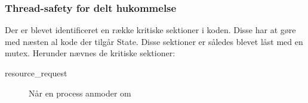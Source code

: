 \subsubsection*{Thread-safety for delt hukommelse}
Der er blevet identificeret en række kritiske sektioner i koden. Disse har at gøre med næsten al kode der tilgår State. Disse sektioner er således blevet låst med en mutex. Herunder nævnes de kritiske sektioner:
\begin{description}
	\item[resource\_request] Når en process anmoder om 
	\item[]
	\item[]
\end{description}





